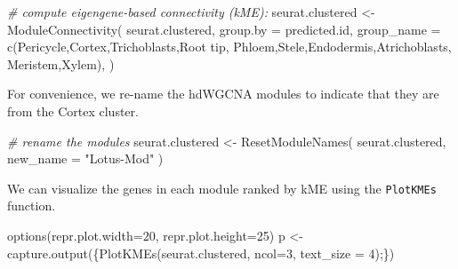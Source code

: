 \documentclass[
  letterpaper,
  DIV=11,
  numbers=noendperiod]{scrartcl}
\newenvironment{Shaded}{\begin{snugshade}}{\end{snugshade}}
\newcommand{\AttributeTok}[1]{\textcolor[rgb]{0.49,0.56,0.16}{#1}}
\newcommand{\CommentTok}[1]{\textcolor[rgb]{0.38,0.63,0.69}{\textit{#1}}}
\newcommand{\DecValTok}[1]{\textcolor[rgb]{0.25,0.63,0.44}{#1}}
\newcommand{\FunctionTok}[1]{\textcolor[rgb]{0.02,0.16,0.49}{#1}}
\newcommand{\NormalTok}[1]{\textcolor[rgb]{0.00,0.44,0.13}{#1}}
\newcommand{\OtherTok}[1]{\textcolor[rgb]{0.00,0.44,0.13}{#1}}
\newcommand{\StringTok}[1]{\textcolor[rgb]{0.25,0.44,0.63}{#1}}
\begin{document}
\begin{Shaded}
\begin{Highlighting}[]
\CommentTok{\# compute eigengene{-}based connectivity (kME):}
\NormalTok{seurat.clustered }\OtherTok{\textless{}{-}} \FunctionTok{ModuleConnectivity}\NormalTok{(}
\NormalTok{  seurat.clustered,}
  \AttributeTok{group.by =} \StringTok{\textquotesingle{}predicted.id\textquotesingle{}}\NormalTok{, }
  \AttributeTok{group\_name =} \FunctionTok{c}\NormalTok{(}\StringTok{\textquotesingle{}Pericycle\textquotesingle{}}\NormalTok{,}\StringTok{\textquotesingle{}Cortex\textquotesingle{}}\NormalTok{,}\StringTok{\textquotesingle{}Trichoblasts\textquotesingle{}}\NormalTok{,}\StringTok{\textquotesingle{}Root tip\textquotesingle{}}\NormalTok{,}
                 \StringTok{\textquotesingle{}Phloem\textquotesingle{}}\NormalTok{,}\StringTok{\textquotesingle{}Stele\textquotesingle{}}\NormalTok{,}\StringTok{\textquotesingle{}Endodermis\textquotesingle{}}\NormalTok{,}\StringTok{\textquotesingle{}Atrichoblasts\textquotesingle{}}\NormalTok{,}
                 \StringTok{\textquotesingle{}Meristem\textquotesingle{}}\NormalTok{,}\StringTok{\textquotesingle{}Xylem\textquotesingle{}}\NormalTok{),}
\NormalTok{)}
\end{Highlighting}
\end{Shaded}

For convenience, we re-name the hdWGCNA modules to indicate that they
are from the Cortex cluster.

\begin{Shaded}
\begin{Highlighting}[]
\CommentTok{\# rename the modules}
\NormalTok{seurat.clustered }\OtherTok{\textless{}{-}} \FunctionTok{ResetModuleNames}\NormalTok{(}
\NormalTok{  seurat.clustered,}
  \AttributeTok{new\_name =} \StringTok{"Lotus{-}Mod"}
\NormalTok{)}
\end{Highlighting}
\end{Shaded}

We can visualize the genes in each module ranked by kME using the
\texttt{PlotKMEs} function.

\begin{Shaded}
\begin{Highlighting}[]
\FunctionTok{options}\NormalTok{(}\AttributeTok{repr.plot.width=}\DecValTok{20}\NormalTok{, }\AttributeTok{repr.plot.height=}\DecValTok{25}\NormalTok{)}
\NormalTok{p }\OtherTok{\textless{}{-}} \FunctionTok{capture.output}\NormalTok{(\{}\FunctionTok{PlotKMEs}\NormalTok{(seurat.clustered, }\AttributeTok{ncol=}\DecValTok{3}\NormalTok{, }\AttributeTok{text\_size =} \DecValTok{4}\NormalTok{);\})}
\end{Highlighting}
\end{Shaded}
\end{document}
